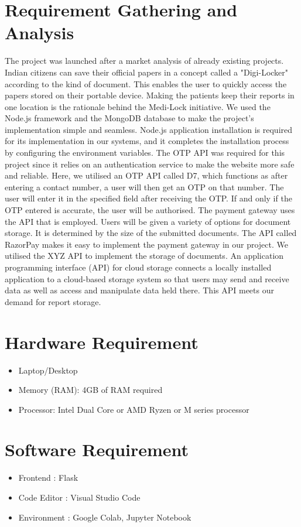 \documentclass[a4paper, 12pt]{report}
\begin{document}
\section{Requirement Gathering and Analysis }
\par The project was launched after a market analysis of already existing projects. Indian citizens can save their official papers in a concept called a "Digi-Locker" according to the kind of document. This enables the user to quickly access the papers stored on their portable device. Making the patients keep their reports in one location is the rationale behind the Medi-Lock initiative.
We used the Node.js framework and the MongoDB database to make the project's implementation simple and seamless. Node.js application installation is required for its implementation in our systems, and it completes the installation process by configuring the environment variables.
The OTP API was required for this project since it relies on an authentication service to make the website more safe and reliable. Here, we utilised an OTP API called D7, which functions as after entering a contact number, a user will then get an OTP on that number. The user will enter it in the specified field after receiving the OTP. If and only if the OTP entered is accurate, the user will be authorised.
The payment gateway uses the API that is employed. Users will be given a variety of options for document storage. It is determined by the size of the submitted documents. The API called RazorPay makes it easy to implement the payment gateway in our project.
We utilised the XYZ API to implement the storage of documents. An application programming interface (API) for cloud storage connects a locally installed application to a cloud-based storage system so that users may send and receive data as well as access and manipulate data held there. This API meets our demand for report storage.
 

\section{Hardware Requirement }
\begin{itemize}
  \item Laptop/Desktop
  \item Memory (RAM): 4GB of RAM required
  \item Processor: Intel Dual Core or AMD Ryzen or M series processor
\end{itemize}


\section{Software Requirement }
\begin{itemize}
  \item Frontend : Flask
  \item Code Editor : Visual Studio Code
  \item Environment : Google Colab, Jupyter Notebook
\end{itemize} 
\end{document}
